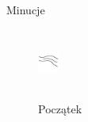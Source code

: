 \documentclass{beamer}
\begin{document}
\begin{frame}{Minucje}
    \begin{columns}
            \begin{figure}[t]
			    \centering
                \includegraphics[width=0.4\textwidth]{fingerprints/minucje/poczatek.jpg}\\~\
                 \caption*{Początek}
            \end{figure}
           

\end{columns}
\end{frame}
\end{document}

